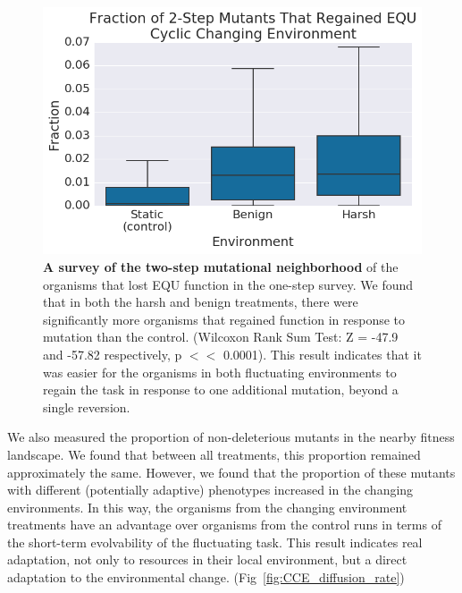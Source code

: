 \documentclass[PhD]{msu-thesis}
\begin{document}
	\begin{figure}[!h] %
	\includegraphics[trim={0.2cm 0 0.4cm 0.25cm},clip,width=0.75\columnwidth]{figures/CE/CCE_frac_2step__box.png}

	\caption{\textbf{A survey of the two-step mutational neighborhood} of the organisms that lost EQU function in the one-step survey. We found that in both the harsh and benign treatments, there were significantly more organisms that regained function in response to mutation than the control. (Wilcoxon Rank Sum Test: Z = -47.9 and -57.82 respectively, p $<<$ 0.0001). This result indicates that it was easier for the organisms in both fluctuating environments to regain the task in response to one additional mutation, beyond a single reversion. 
	}\label{fig:CCE_two_step}
	\end{figure}

We also measured the proportion of non-deleterious mutants in the nearby fitness landscape. We found that between all treatments, this proportion
remained approximately the same. However, we found that the proportion of these mutants with different (potentially adaptive) phenotypes increased in the changing environments. In this way, the organisms from the changing environment treatments have an advantage over organisms from the control runs in terms of the short-term evolvability of the fluctuating task. This result indicates real adaptation, not only to resources in their local environment, but a direct adaptation to the environmental change. (Fig~\ref{fig:CCE_diffusion_rate})
\end{document}
